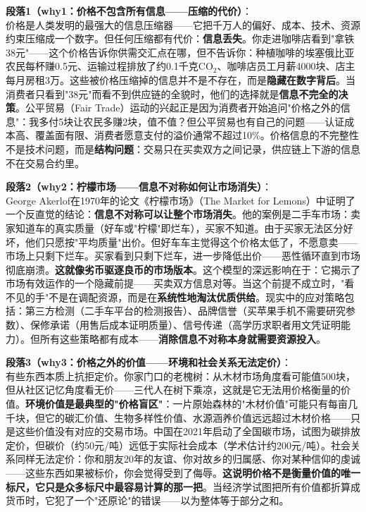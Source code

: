 \documentclass[../main.tex]{subfiles}
\begin{document}
	\textbf{段落1（why1：价格不包含所有信息——压缩的代价）}：\\
	价格是人类发明的最强大的信息压缩器——它把千万人的偏好、成本、技术、资源约束压缩成一个数字。但任何压缩都有代价：\textbf{信息丢失}。你走进咖啡店看到"拿铁38元"——这个价格告诉你供需交汇点在哪，但不告诉你：种植咖啡的埃塞俄比亚农民每杯赚0.5元、运输过程排放了约0.1千克CO$_2$、咖啡店员工月薪4000块、店主每月房租3万。这些被价格压缩掉的信息并不是不存在，而是\textbf{隐藏在数字背后}。当消费者只看到"38元"而看不到供应链的全貌时，他们的选择就是\textbf{信息不完全的决策}。公平贸易（Fair Trade）运动的兴起正是因为消费者开始追问"价格之外的信息"：我多付5块让农民多赚2块，值不值？但公平贸易也有自己的问题——认证成本高、覆盖面有限、消费者愿意支付的溢价通常不超过10\%。价格信息的不完整性不是技术问题，而是\textbf{结构问题}：交易只在买卖双方之间记录，供应链上下游的信息不在交易合约里。

	\textbf{段落2（why2：柠檬市场——信息不对称如何让市场消失）}：\\
	George Akerlof在1970年的论文《柠檬市场》（The Market for Lemons）中证明了一个反直觉的结论：\textbf{信息不对称可以让整个市场消失}。他的案例是二手车市场：卖家知道车的真实质量（好车或"柠檬"即烂车），买家不知道。由于买家无法区分好坏，他们只愿按"平均质量"出价。但好车车主觉得这个价格太低了，不愿意卖——市场上只剩下烂车。买家看到只剩下烂车，进一步降低出价——恶性循环直到市场彻底崩溃。\textbf{这就像劣币驱逐良币的市场版本}。这个模型的深远影响在于：它揭示了市场有效运作的一个隐藏前提——买卖双方信息对等。当这个前提不成立时，"看不见的手"不是在调配资源，而是在\textbf{系统性地淘汰优质供给}。现实中的应对策略包括：第三方检测（二手车平台的检测报告）、品牌信誉（买苹果手机不需要研究参数）、保修承诺（用售后成本证明质量）、信号传递（高学历求职者用文凭证明能力）。但所有这些策略都有成本——\textbf{消除信息不对称本身就需要资源投入}。

	\textbf{段落3（why3：价格之外的价值——环境和社会关系无法定价）}：\\
	有些东西本质上抗拒定价。你家门口的老槐树：从木材市场角度看可能值500块，但从社区记忆角度看无价——三代人在树下乘凉，这就是它无法用价格衡量的价值。\textbf{环境价值是最典型的"价格盲区"}：一片原始森林的"木材价值"可能只有每亩几千块，但它的碳汇价值、生物多样性价值、水源涵养价值远远超过木材价格——只是这些价值没有对应的交易市场。中国在2021年启动了全国碳市场，试图为碳排放定价，但碳价（约50元/吨）远低于实际社会成本（学术估计约200元/吨）。社会关系同样无法定价：你和朋友20年的友谊、你对故乡的归属感、你对某种信仰的虔诚——这些东西如果被标价，你会觉得受到了侮辱。\textbf{这说明价格不是衡量价值的唯一标尺，它只是众多标尺中最容易计算的那一把}。当经济学试图把所有价值都折算成货币时，它犯了一个"还原论"的错误——以为整体等于部分之和。
\end{document}
